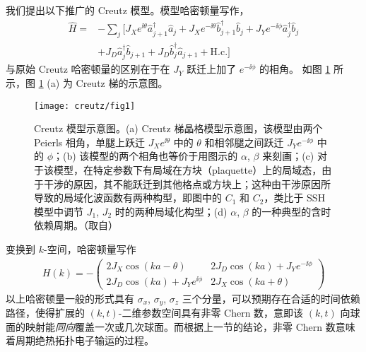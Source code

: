 我们提出以下推广的 Creutz 模型。模型哈密顿量写作，
\begin{align}
\hat{H} =&-\sum_{j} [J_X e^{\ii\theta} \hat{a}_{j+1}^\dag \hat{a}_{j}+J_X e^{-\ii\theta} \hat{b}_{j+1}^\dag \hat{b}_{j} + J_Y e^{-\ii\phi} \hat{a}_j^\dag \hat{b}_j 
\nonumber\\
&+ J_D \hat{a}_j^\dag \hat{b}_{j+1}+J_D \hat{b}_j^\dag \hat{a}_{j+1} +\textrm{H.c.}]
\end{align}
与原始 Creutz 哈密顿量的区别在于在 $J_Y$ 跃迁上加了 $e^{-\ii\phi}$ 的相角。
如图 \ref{fig:creutz:schematic} 所示，图 \ref{fig:creutz:schematic} (a) 为 Creutz 梯的示意图。
\begin{figure}[!htb]
\centering
\texttt{[image: creutz/fig1]}
\caption{Creutz 模型示意图。(a) Creutz 梯晶格模型示意图，该模型由两个 Peierls 相角，单腿上跃迁 $J_Xe^{\ii\theta}$ 中的 $\theta$ 和相邻腿之间跃迁 $J_Ye^{-\ii\phi}$ 中的 $\phi$；(b) 该模型的两个相角也等价于用图示的 $\alpha$, $\beta$ 来刻画；(c) 对于该模型，在特定参数下有局域在方块（plaquette）上的局域态，由于干涉的原因，其不能跃迁到其他格点或方块上\cite{creutz,creutz1999}；这种由干涉原因所导致的局域化波函数有两种构型，即图中的 $C_1$ 和 $C_2$，类比于 SSH 模型中调节 $J_1$, $J_2$ 时的两种局域化构型；(d) $\alpha$, $\beta$ 的一种典型的含时依赖周期。（取自）}
\label{fig:creutz:schematic}
\end{figure}
变换到 $k$-空间，哈密顿量写作
\begin{align}
H(k)=-\begin{pmatrix} 2 J_X \cos(ka-\theta)& 2 J_D\cos(ka)+J_Y e^{-\ii\phi}\\
2 J_D\cos(ka)+J_Y e^{\ii\phi}& 2 J_X \cos(ka+\theta)\end{pmatrix}
\end{align}
以上哈密顿量一般的形式具有 $\sigma_x$, $\sigma_y$, $\sigma_z$ 三个分量，可以预期存在合适的时间依赖路径，使得扩展的 $(k,t)$-二维参数空间具有非零 Chern 数，意即该 $(k,t)$ 向球面的映射能\textit{同向}覆盖一次或几次球面。而根据上一节的结论，非零 Chern 数意味着周期绝热拓扑电子输运的过程。

